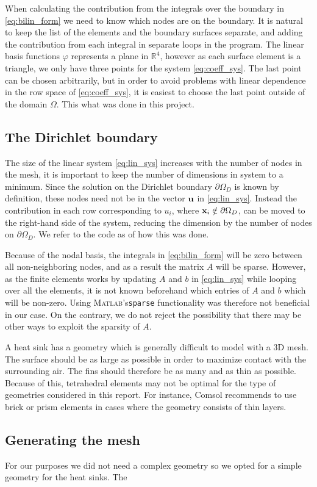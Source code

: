 When calculating the contribution from the integrals over the boundary in \eqref{eq:bilin_form} we need to know which nodes are on the boundary. It is natural to keep the list of the elements and the boundary surfaces separate, and adding the contribution from each integral in separate loops in the program. The linear basis functions $\varphi$ represents a plane in $\mathbb{R}^4$, however as each surface element is a triangle, we only have three points for the system \eqref{eq:coeff_sys}. The last point can be chosen arbitrarily,  but in order to avoid problems with linear dependence in the row space of \eqref{eq:coeff_sys}, it is easiest to choose the last point outside of the domain $\Omega$. This what was done in this project.

\subsection{The Dirichlet boundary}
 The size of the linear system \eqref{eq:lin_sys} increases with the number of nodes in the mesh, it is important to keep the number of dimensions in system to a minimum. Since the solution on the Dirichlet boundary $\partial\Omega_D$ is known by definition, these nodes need not be in the vector $\vb{u}$ in \eqref{eq:lin_sys}. Instead the contribution in each row corresponding to $u_i$, where $\vb{x}_i \notin \partial\Omega_D$, can be moved to the right-hand side of the system, reducing the dimension by the number of nodes on $\partial\Omega_D$. We refer to the code as of how this was done.

 Because of the nodal basis, the integrals in \eqref{eq:bilin_form} will be zero between all non-neighboring nodes, and as a result the matrix $A$ will be sparse. However, as the finite elements works by updating $A$ and $b$ in \eqref{eq:lin_sys} while looping over all the elements, it is not known beforehand which entries of $A$ and $b$ which will be non-zero. Using \textsc{Matlab}'s\xspace \texttt{sparse} functionality was therefore not beneficial in our case. On the contrary, we do not reject the possibility that there may be other ways to exploit the sparsity of $A$.

 A heat sink has a geometry which is generally difficult to model with a 3D mesh. The surface should be as large as possible in order to maximize contact with the surrounding air. The fins should therefore be as many and as thin as possible. Because of this, tetrahedral elements may not be optimal for the type of geometries considered in this report. For instance, Comsol \cite{comsol_mesh_types} recommends to use brick or prism elements in cases where the geometry consists of thin layers.
\subsection{Generating the mesh}
 For our purposes we did not need a complex geometry so we opted for a simple geometry for the heat sinks. The
